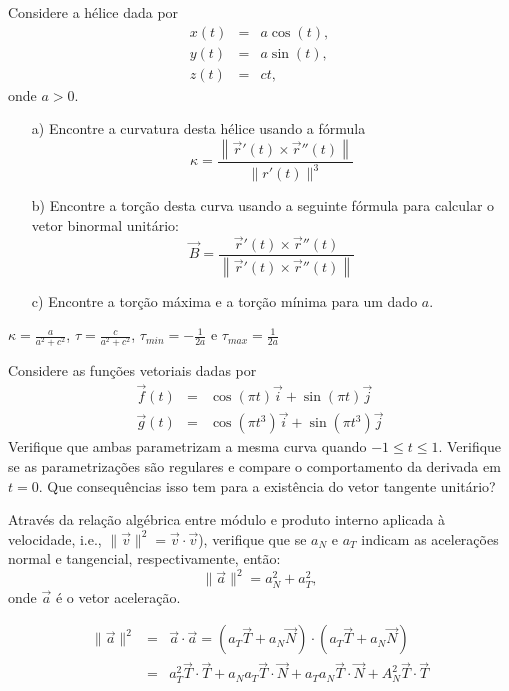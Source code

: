 \begin{exer} Considere a hélice dada por
\begin{eqnarray*}
x(t)&=&a\cos(t),\\
y(t)&=&a\sin(t),\\
z(t)&=&ct,
\end{eqnarray*}
onde $a>0$.
\begin{itemize}
\item[a)] Encontre  a curvatura desta hélice usando a fórmula
$$\kappa=\frac{\left\|\vec{r}'(t)\times \vec{r}''(t)\right\|}{\|r'(t)\|^3}$$
\item[b)] Encontre a torção desta curva usando a seguinte fórmula para calcular o vetor binormal unitário: $$\vec{B}=\frac{\vec{r}'(t)\times \vec{r}''(t)}{\left\|\vec{r}'(t)\times \vec{r}''(t)\right\|}$$
\item[c)] Encontre a torção máxima e a torção mínima para um dado $a$. 
\end{itemize}
\end{exer}
\begin{resp}
 $\kappa= \frac{a}{a^2+c^2}$, $\tau = \frac{c}{a^2+c^2}$, $\tau_{min} = -\frac{1}{2a}$ e $\tau_{max} = \frac{1}{2a}$ 
\end{resp}


\begin{exer}
Considere as funções vetoriais dadas por
\begin{eqnarray*}
\vec{f}(t)&=&\cos(\pi t)\vec{i}+\sin(\pi t)\vec{j}\\
\vec{g}(t)&=&\cos(\pi t^3)\vec{i}+\sin(\pi t^3)\vec{j}
\end{eqnarray*}
Verifique que ambas parametrizam a mesma curva quando $-1\leq t \leq 1$. Verifique se as parametrizações são regulares e compare o comportamento da derivada em $t=0$. Que consequências isso tem para a existência do vetor tangente unitário? 
\end{exer}



\begin{exer} Através da relação algébrica entre módulo e produto interno aplicada à velocidade, i.e., $\|\vec{v}\|^2=\vec{v}\cdot\vec{v}$), verifique que se $a_N$ e $a_T$ indicam as acelerações normal e tangencial, respectivamente, então:
$$\|\vec{a}\|^2=a_N^2+a_T^2,$$
onde $\vec{a}$ é o vetor aceleração.
\end{exer}
\begin{resp}
 \begin{eqnarray}
\|\vec{a}\|^2&=&\vec{a}\cdot\vec{a}=\left(a_T\vec{T}+a_N\vec{N}\right)\cdot\left(a_T\vec{T}+a_N\vec{N}\right)\\
&=&a_T^2\vec{T}\cdot\vec{T}+a_Na_T\vec{T}\cdot\vec{N}+a_Ta_N\vec{T}\cdot\vec{N}+A_N^2\vec{T}\cdot\vec{T}  
 \end{eqnarray}
\end{resp}


